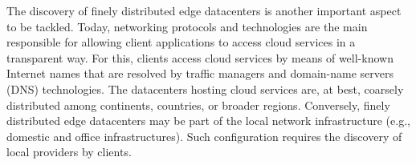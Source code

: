 The discovery of finely distributed edge datacenters is another important aspect to be tackled. Today, networking protocols and technologies are the main responsible for allowing client applications to access cloud services in a transparent way. For this, clients access cloud services by means of well-known Internet names that are resolved by traffic managers and domain-name servers (DNS) technologies. The datacenters hosting cloud services are, at best, coarsely distributed among continents, countries, or broader regions. Conversely, finely distributed edge datacenters may be part of the local network infrastructure (e.g., domestic and office infrastructures). Such configuration requires the discovery of local providers by clients. %










